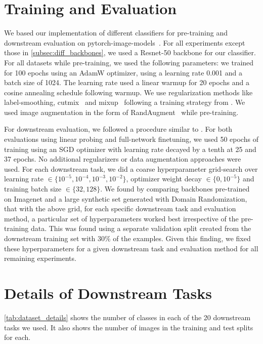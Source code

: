 \section{Training and Evaluation} \label{sec:train_details}
We based our implementation of different classifiers for pre-training and downstream evaluation on pytorch-image-models~\cite{rw2019timm}. For all experiments except those in \cref{subsec:diff_backbones}, we used a Resnet-50 backbone for our classifier. For all datasets while pre-training, we used the following parameters: we trained for 100 epochs using an AdamW optimizer, using a learning rate 0.001 and a batch size of 1024. The learning rate used a linear warmup for 20 epochs and a cosine annealing schedule following warmup. We use regularization methods like label-smoothing, cutmix~\cite{yun2019cutmix} and mixup~\cite{zhang2017mixup} following a training strategy from \cite{rw2019timm}. We used image augmentation in the form of RandAugment~\cite{cubuk2020randaugment} while pre-training.

For downstream evaluation, we followed a procedure similar to \cite{islam2021broad}. For both evaluations using linear probing and full-network finetuning, we used 50 epochs of training using an SGD optimizer with learning rate decayed by a tenth at 25 and 37 epochs. No additional regularizers or data augmentation approaches were used. For each downstream task, we did a coarse hyperparameter grid-search over learning rate $\in \{10^{-5}, 10^{-4}, 10^{-3}, 10^{-2}\}$, optimizer weight decay $\in \{0, 10^{-5}\}$ and training batch size $\in \{32, 128\}$. We found by comparing backbones pre-trained on Imagenet and a large synthetic set generated with Domain Randomization, that with the above grid, for each specific downstream task and evaluation method, a particular set of hyperparameters worked best irrespective of the pre-training data. This was found using a separate validation split created from the downstream training set with 30\% of the examples. Given this finding, we fixed these hyperparameters for a given downstream task and evaluation method for all remaining experiments.

\section{Details of Downstream Tasks} \label{sec:downstream_details}
\cref{tab:dataset_details} shows the number of classes in each of the 20 downstream tasks we used. It also shows the number of images in the training and test splits for each.

